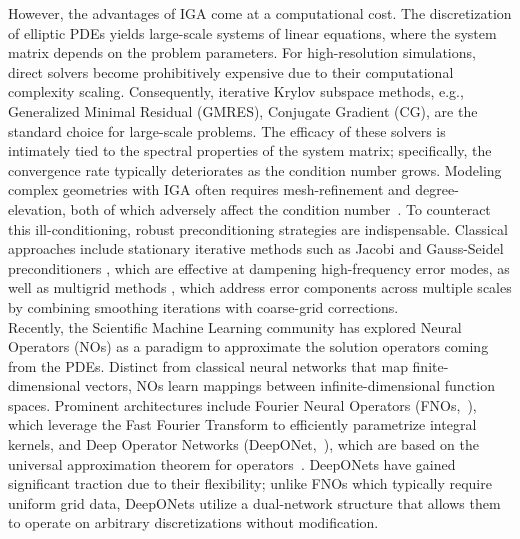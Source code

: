 \documentclass{article}
\theoremstyle{plain}
\numberwithin{equation}{section}
\begin{document}
However, the advantages of IGA come at a computational cost. The discretization of elliptic  PDEs yields large-scale systems of linear equations, where the system matrix depends on the problem parameters. For high-resolution simulations, direct solvers become prohibitively expensive due to their computational complexity scaling. Consequently, iterative Krylov subspace methods, e.g., Generalized Minimal Residual (GMRES), Conjugate Gradient (CG), are the standard choice for large-scale problems. The efficacy of these solvers is intimately tied to the spectral properties of the system matrix; specifically, the convergence rate typically deteriorates as the condition number grows. Modeling complex geometries with IGA often requires mesh-refinement and degree-elevation, both of which adversely affect the condition number~\cite{sangalli2016isogeometric, gahalaut2019condition}.
To counteract this ill-conditioning, robust preconditioning strategies are indispensable. Classical approaches include stationary iterative methods such as Jacobi and Gauss-Seidel preconditioners \cite{van2003iterative}, which are effective at dampening high-frequency error modes, as well as multigrid methods \cite{trottenberg2000multigrid}, which address error components across multiple scales by combining smoothing iterations with coarse-grid corrections. 
\\
Recently, the Scientific Machine Learning community has explored Neural Operators (NOs) as a paradigm to approximate the solution operators coming from the PDEs. Distinct from classical neural networks that map finite-dimensional vectors, NOs learn mappings between infinite-dimensional function spaces. Prominent architectures include Fourier Neural Operators (FNOs,~\cite{li2021fourier}), which leverage the Fast Fourier Transform to efficiently parametrize integral kernels, and Deep Operator Networks (DeepONet,~\cite{lu2021learning}), which are based on the universal approximation theorem for operators~\cite{chen1995universal}. DeepONets have gained significant traction due to their flexibility; unlike FNOs which typically require uniform grid data, DeepONets utilize a dual-network structure that allows them to operate on arbitrary discretizations without modification.
\end{document}

